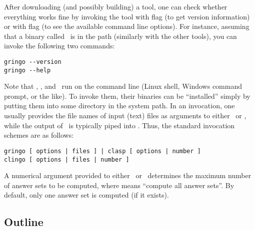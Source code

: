 After downloading (and possibly building) a tool,
one can check whether every\-thing works fine by invoking the tool
with flag  (to get version information) or
with flag  (to see the available command line options).
For instance, assuming that a binary called \gringo\ is in the path
(similarly with the other tools),
you can invoke the following two commands:
%
\begin{lstlisting}[numbers=none]
gringo --version
gringo --help
\end{lstlisting}

Note that \gringo, \clasp, and \clingo\ 
run on the command line (Linux shell, Windows command prompt, or the like).
To invoke them, their binaries can be ``installed''
simply by putting them into some directory in the system path.
In an invocation,
one usually provides the file names of input (text) files 
as arguments to either \gringo\ or \clingo,
while the output of \gringo\ is typically piped into \clasp.
Thus, the standard invocation schemes are as follows:
\begin{lstlisting}[numbers=none]
gringo [ options | files ] | clasp [ options | number ]
clingo [ options | files | number ]
\end{lstlisting}
A numerical argument provided to either \clasp\ or \clingo\
determines the maximum number of answer sets to be computed,
where \code{0} means ``compute all answer sets''.
By default, only one answer set is computed (if it exists).

\subsection{Outline}\label{sec:outline}

